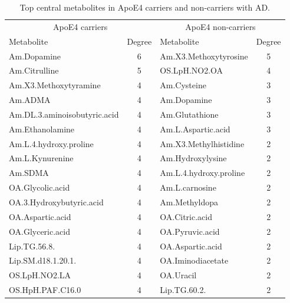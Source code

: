 \documentclass{amsart}
\begin{document}
\clearpage
\begin{table}[H]
  \caption{\label{tab:degrees} Top central metabolites in ApoE4 carriers and non-carriers with AD.}
  \begin{threeparttable}
  \begin{tabular}{lclc}\toprule
  \multicolumn{2}{c}{ApoE4 carriers} & \multicolumn{2}{c}{ApoE4 non-carriers} \\
  Metabolite & Degree & Metabolite & Degree \\ \midrule
  Am.Dopamine                    & 6      & Am.X3.Methoxytyrosine         & 5      \\
  Am.Citrulline                  & 5      & OS.LpH.NO2.OA                 & 4      \\
  Am.X3.Methoxytyramine          & 4      & Am.Cysteine                   & 3      \\
  Am.ADMA                        & 4      & Am.Dopamine                   & 3      \\
  Am.DL.3.aminoisobutyric.acid   & 4      & Am.Glutathione                & 3      \\
  Am.Ethanolamine                & 4      & Am.L.Aspartic.acid            & 3      \\
  Am.L.4.hydroxy.proline         & 4      & Am.X3.Methylhistidine         & 2      \\
  Am.L.Kynurenine                & 4      & Am.Hydroxylysine              & 2      \\
  Am.SDMA                        & 4      & Am.L.4.hydroxy.proline        & 2      \\
  OA.Glycolic.acid               & 4      & Am.L.carnosine                & 2      \\
  OA.3.Hydroxybutyric.acid       & 4      & Am.Methyldopa                 & 2      \\
  OA.Aspartic.acid               & 4      & OA.Citric.acid                & 2      \\
  OA.Glyceric.acid               & 4      & OA.Pyruvic.acid               & 2      \\
  Lip.TG.56.8.                   & 4      & OA.Aspartic.acid              & 2      \\
  Lip.SM.d18.1.20.1.             & 4      & OA.Iminodiacetate             & 2      \\
  OS.LpH.NO2.LA                  & 4      & OA.Uracil                     & 2      \\
  OS.HpH.PAF.C16.0               & 4      & Lip.TG.60.2.                  & 2      \\

\end{tabular}
\end{threeparttable}
\end{table}
\end{document}
